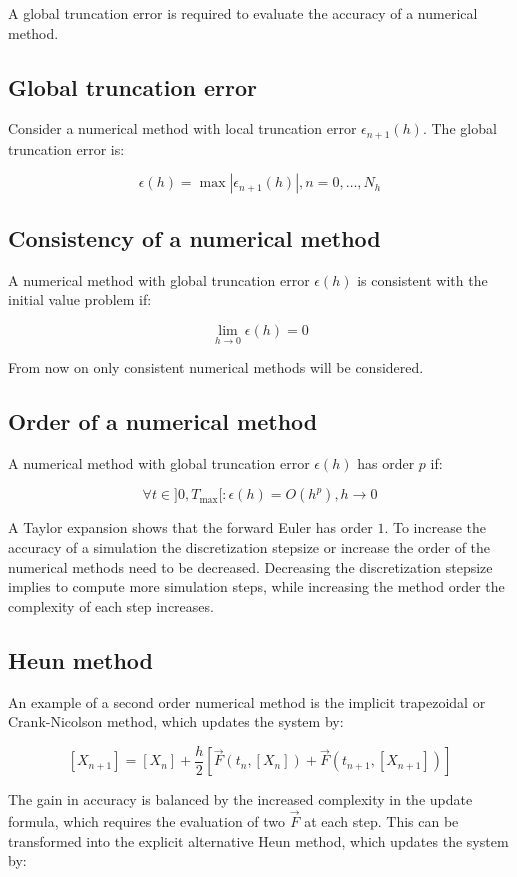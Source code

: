A global truncation error is required to evaluate the accuracy of a numerical method.

  \subsection{Global truncation error}
  Consider a numerical method with local truncation error $\epsilon_{n+1}(h)$.
  The global truncation error is:

  $$\epsilon(h) = \max|\epsilon_{n+1}(h)|, n = 0, \dots, N_h$$

  \subsection{Consistency of a numerical method}
  A numerical method with global truncation error $\epsilon(h)$ is consistent with the initial value problem if:

  $$\lim\limits_{h\rightarrow 0}\epsilon(h) = 0$$

  From now on only consistent numerical methods will be considered.

  \subsection{Order of a numerical method}
  A numerical method with global truncation error $\epsilon(h)$ has order $p$ if:

  $$\forall t\in]0, T_{\max}[: \epsilon(h) = O(h^p), h\rightarrow 0$$

  A Taylor expansion shows that the forward Euler has order $1$.
  To increase the accuracy of a simulation the discretization stepsize or increase the order of the numerical methods need to be decreased.
  Decreasing the discretization stepsize implies to compute more simulation steps, while increasing the method order the complexity of each step increases.

  \subsection{Heun method}
  An example of a second order numerical method is the implicit trapezoidal or Crank-Nicolson method, which updates the system by:

  $$[X_{n+1}] = [X_n] + \frac{h}{2}[\vec{F}(t_n, [X_n]) + \vec{F}(t_{n+1}, [X_{n+1}])]$$

  The gain in accuracy is balanced by the increased complexity in the update formula, which requires the evaluation of two $\vec{F}$ at each step.
  This can be transformed into the explicit alternative Heun method, which updates the system by:

